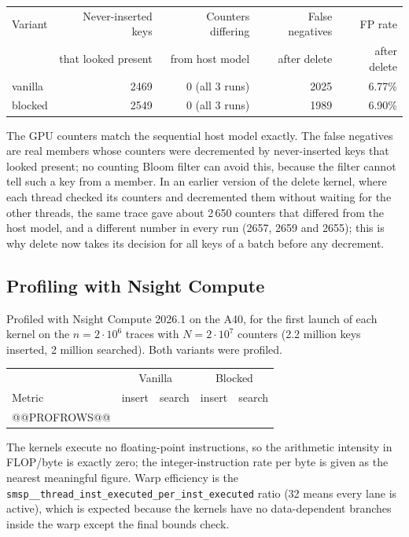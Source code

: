 \documentclass[11pt]{article}
\begin{document}
\begin{center}
\begin{tabular}{lrrrr}
\toprule
Variant & Never-inserted keys & Counters differing & False negatives & FP rate \\
 & that looked present & from host model & after delete & after delete \\
\midrule
vanilla & 2469 & 0 (all 3 runs) & 2025 & 6.77\% \\
blocked & 2549 & 0 (all 3 runs) & 1989 & 6.90\% \\
\bottomrule
\end{tabular}
\end{center}
The GPU counters match the sequential host model exactly. The false negatives
are real members whose counters were decremented by never-inserted keys that
looked present; no counting Bloom filter can avoid this, because the filter
cannot tell such a key from a member. In an earlier version of the delete
kernel, where each thread checked its counters and decremented them without
waiting for the other threads, the same trace gave about 2\,650 counters that
differed from the host model, and a different number in every run (2657, 2659
and 2655); this is why delete now takes its decision for all keys of a batch
before any decrement.

\subsection*{Profiling with Nsight Compute}
Profiled with Nsight Compute 2026.1 on the A40, for the first launch of each
kernel on the $n=2\cdot10^6$ traces with $N=2\cdot10^7$ counters (2.2 million
keys inserted, 2 million searched). Both variants were profiled.

\begin{center}
\small
\begin{tabular}{lrrrr}
\toprule
 & \multicolumn{2}{c}{Vanilla} & \multicolumn{2}{c}{Blocked} \\
Metric & insert & search & insert & search \\
\midrule
@@PROFROWS@@
\bottomrule
\end{tabular}
\end{center}
The kernels execute no floating-point instructions, so the arithmetic
intensity in FLOP/byte is exactly zero; the integer-instruction rate per byte
is given as the nearest meaningful figure. Warp efficiency is the
\texttt{smsp\_\_thread\_inst\_executed\_per\_inst\_executed} ratio (32 means
every lane is active), which is expected because the kernels have no
data-dependent branches inside the warp except the final bounds check.
\end{document}
